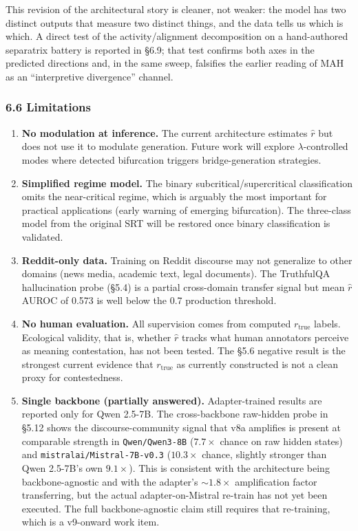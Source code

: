 \documentclass[
  11pt]{article}
\begin{document}
This revision of the architectural story is cleaner, not weaker: the
model has two distinct outputs that measure two distinct things, and the
data tells us which is which. A direct test of the activity/alignment
decomposition on a hand-authored separatrix battery is reported in §6.9;
that test confirms both axes in the predicted directions and, in the
same sweep, falsifies the earlier reading of MAH as an ``interpretive
divergence'' channel.

\subsubsection{6.6 Limitations}\label{limitations}

\begin{enumerate}
\def\labelenumi{\arabic{enumi}.}
\item
  \textbf{No modulation at inference.} The current architecture
  estimates \(\hat{r}\) but does not use it to modulate generation.
  Future work will explore \(\lambda\)-controlled modes where detected
  bifurcation triggers bridge-generation strategies.
\item
  \textbf{Simplified regime model.} The binary subcritical/supercritical
  classification omits the near-critical regime, which is arguably the
  most important for practical applications (early warning of emerging
  bifurcation). The three-class model from the original SRT will be
  restored once binary classification is validated.
\item
  \textbf{Reddit-only data.} Training on Reddit discourse may not
  generalize to other domains (news media, academic text, legal
  documents). The TruthfulQA hallucination probe (§5.4) is a partial
  cross-domain transfer signal but mean \(\hat{r}\) AUROC of 0.573 is
  well below the 0.7 production threshold.
\item
  \textbf{No human evaluation.} All supervision comes from computed
  \(r_{\text{true}}\) labels. Ecological validity, that is, whether
  \(\hat{r}\) tracks what human annotators perceive as meaning
  contestation, has not been tested. The §5.6 negative result is the
  strongest current evidence that \(r_{\text{true}}\) as currently
  constructed is not a clean proxy for contestedness.
\item
  \textbf{Single backbone (partially answered).} Adapter-trained results
  are reported only for Qwen 2.5-7B. The cross-backbone raw-hidden probe
  in §5.12 shows the discourse-community signal that v8a amplifies is
  present at comparable strength in \texttt{Qwen/Qwen3-8B}
  (\(7.7\times\) chance on raw hidden states) and
  \texttt{mistralai/Mistral-7B-v0.3} (\(10.3\times\) chance, slightly
  stronger than Qwen 2.5-7B's own \(9.1\times\)). This is consistent
  with the architecture being backbone-agnostic and with the adapter's
  \(\sim 1.8\times\) amplification factor transferring, but the actual
  adapter-on-Mistral re-train has not yet been executed. The full
  backbone-agnostic claim still requires that re-training, which is a
  v9-onward work item.
\end{enumerate}
\end{document}
